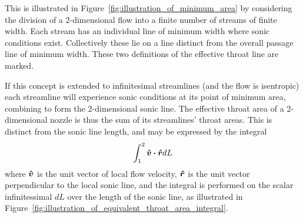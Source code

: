 \documentclass[a4paper, 11pt, twoside]{report}
\begin{document}
This is illustrated in Figure~\ref{fig:illustration_of_minimum_area} by considering the division of a 2-dimensional flow into a finite number of streams of finite width. Each stream has an individual line of minimum width where sonic conditions exist. Collectively these lie on a line distinct from the overall passage line of minimum width. These two definitions of the effective throat line are marked.

If this concept is extended to infinitesimal streamlines (and the flow is isentropic) each streamline will experience sonic conditions at its point of minimum area, combining to form the 2-dimensional sonic line. The effective throat area of a 2-dimensional nozzle is thus the sum of its streamlines' throat areas. This is distinct from the sonic line length, and may be expressed by the integral
\begin{equation}
	\int_{1}^2 \vu*{v} \vdot \vu*{r} dL
\end{equation}
where $\vu*{v}$ is the unit vector of local flow velocity, $\vu*{r}$ is the unit vector perpendicular to the local sonic line, and the integral is performed on the scalar infinitessimal $dL$ over the length of the sonic line, as illustrated in Figure~\ref{fig:illustration_of_equivalent_throat_area_integral}.
 		
\end{document}
